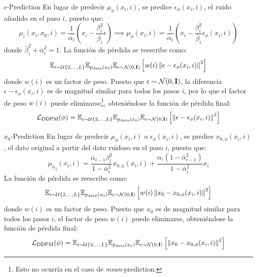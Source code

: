 \documentclass{beamer}
\begin{document}
\begin{frame}{$\epsilon$-Prediction}
    En lugar de predecir $\mu_\phi(x_i, i)$, se predice $\epsilon_\phi(x_i, i)$, el ruido añadido en el paso $i$, puesto que:
    \begin{equation*}
        \mu_i(x_i, x_0, i) = \frac{1}{\alpha_i} \left( x_i - \frac{\beta_i^2}{\bar{\beta}_i} \epsilon \right) \implies \mu_\phi(x_i, i) = \frac{1}{\alpha_i} \left( x_i - \frac{\beta_i^2}{\bar{\beta}_i} \epsilon_\phi(x_i, i) \right)
    \end{equation*}
    donde $\bar{\beta}_i^2+\bar{\alpha}_i^2 = 1$.
    \pause
    La función de pérdida se reescribe como:
    \begin{equation*}
        \mathbb{E}_{i\sim\mathcal{U}\{2,\dots,L\}} \mathbb{E}_{p_{\text{data}}(x_0)} \mathbb{E}_{\epsilon\sim \mathcal{N}(0,\mathbf{I})} \left[ w(i) \left\| \epsilon - \epsilon_\phi(x_i, i) \right\|^2 \right]
    \end{equation*}
    donde $w(i)$ es un factor de peso.
    \pause
    Puesto que $\epsilon\sim \mathcal{N}(0,\mathbf{I})$, la diferencia $\epsilon - \epsilon_\phi(x_i, i)$ es de magnitud similar para todos los pasos $i$, por lo que el factor de peso $w(i)$ puede eliminarse\footnote{Esto no ocurría en el caso de \emph{mean}-prediction.}, obteniéndose la función de pérdida final:
    \begin{equation*}
        \mathcal{L}_{\text{DDPM}}(\phi) = \mathbb{E}_{i\sim\mathcal{U}\{2,\dots,L\}} \mathbb{E}_{p_{\text{data}}(x_0)} \mathbb{E}_{\epsilon\sim \mathcal{N}(0,\mathbf{I})} \left[ \left\| \epsilon - \epsilon_\phi(x_i, i) \right\|^2 \right]
    \end{equation*}
\end{frame}


\begin{frame}{$x_0$-Prediction}
    En lugar de predecir $\mu_\phi(x_i, i)$ o $\epsilon_\phi(x_i, i)$, se predice $x_{0,\phi}(x_i, i)$, el dato original a partir del dato ruidoso en el paso $i$, puesto que:
    \begin{equation*}
        {\mu_\phi}_i(x_i, i) = \frac{{\bar{\alpha}_{i-1}}\beta_i^2}{1 -\bar{\alpha}_i^2} x_{0,\phi}(x_i, i) + \frac{{\alpha_i}(1 - \bar{\alpha}_{i-1}^2)}{1 - \bar{\alpha}_i^2} x_i
    \end{equation*}
    \pause
    La función de pérdida se reescribe como:
    \begin{equation*}
        \mathbb{E}_{i\sim\mathcal{U}\{2,\dots,L\}} \mathbb{E}_{p_{\text{data}}(x_0)} \mathbb{E}_{\epsilon\sim \mathcal{N}(0,\mathbf{I})} \left[ w(i) \left\| x_0 - x_{0,\phi}(x_i, i) \right\|^2 \right]
    \end{equation*}
    donde $w(i)$ es un factor de peso.
    \pause
    Puesto que $x_0$ es de magnitud similar para todos los pasos $i$, el factor de peso $w(i)$ puede eliminarse, obteniéndose la función de pérdida final:
    \begin{equation*}
        \mathcal{L}_{\text{DDPM}}(\phi) = \mathbb{E}_{i\sim\mathcal{U}\{2,\dots,L\}} \mathbb{E}_{p_{\text{data}}(x_0)} \mathbb{E}_{\epsilon\sim \mathcal{N}(0,\mathbf{I})} \left[ \left\| x_0 - x_{0,\phi}(x_i, i) \right\|^2 \right]
    \end{equation*}
    \pause    
\end{frame}
\end{document}
